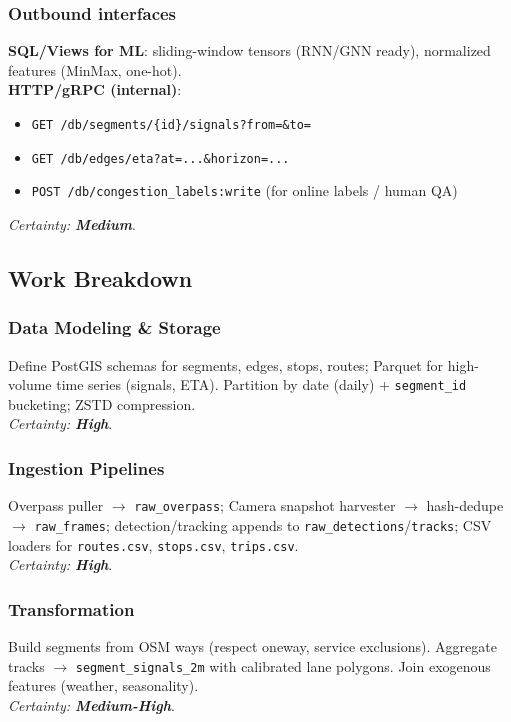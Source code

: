 \subsubsection{Outbound interfaces}
	\textbf{SQL/Views for ML}: sliding-window tensors (RNN/GNN ready), normalized features (MinMax, one-hot).\\
	\textbf{HTTP/gRPC (internal)}:
\begin{itemize}
  \item \texttt{GET /db/segments/\{id\}/signals?from=\&to=}
  \item \texttt{GET /db/edges/eta?at=...\&horizon=...}
  \item \texttt{POST /db/congestion\_labels:write} (for online labels / human QA)
\end{itemize}
    \textit{Certainty: \textbf{Medium}}.

\subsection{Work Breakdown}
\subsubsection{Data Modeling \& Storage}
Define PostGIS schemas for segments, edges, stops, routes; Parquet for high-volume time series (signals, ETA). Partition by date (daily) + \texttt{segment\_id} bucketing; ZSTD compression.\\
	\textit{Certainty: \textbf{High}}.

\subsubsection{Ingestion Pipelines}
Overpass puller $\rightarrow$ \texttt{raw\_overpass}; Camera snapshot harvester $\rightarrow$ hash-dedupe $\rightarrow$ \texttt{raw\_frames}; detection/tracking appends to \texttt{raw\_detections}/\texttt{tracks}; CSV loaders for \texttt{routes.csv}, \texttt{stops.csv}, \texttt{trips.csv}.\\
	\textit{Certainty: \textbf{High}}.

\subsubsection{Transformation}
Build segments from OSM ways (respect oneway, service exclusions). Aggregate tracks $\rightarrow$ \texttt{segment\_signals\_2m} with calibrated lane polygons. Join exogenous features (weather, seasonality).\\
	\textit{Certainty: \textbf{Medium-High}}.

